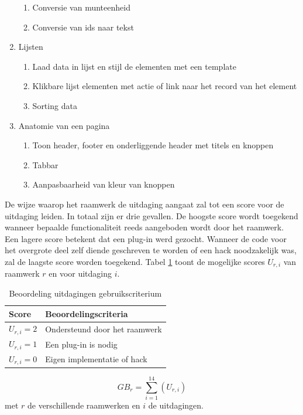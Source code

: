 \begin{enumerate}[label*=U \arabic*.]
\begin{enumerate}[label*=\arabic*]
\item Conversie van munteenheid
\item Conversie van ids naar tekst	
\end{enumerate}
\item \label{challenge:lijsten}Lijsten
\begin{enumerate}[label*=\arabic*]
\item Laad data in lijst en stijl de elementen met een template
\item Klikbare lijst elementen met actie of link naar het record van het element
\item Sorting data
\end{enumerate}
\item \label{challenge:anatomie}Anatomie van een pagina
\begin{enumerate}[label*=\arabic*]
 \item Toon header,  footer en onderliggende header met titels en knoppen
 \item Tabbar
 \item Aanpasbaarheid van kleur van knoppen
 \end{enumerate}
\end{enumerate} 

De wijze waarop het raamwerk de uitdaging aangaat zal tot een score voor de uitdaging leiden.
In totaal zijn er drie gevallen.
De hoogste score wordt toegekend wanneer bepaalde functionaliteit reeds aangeboden wordt door het raamwerk. 
Een lagere score betekent dat een plug-in werd gezocht. 
Wanneer de code voor het overgrote deel zelf diende geschreven te worden of een hack noodzakelijk was, zal de laagste score worden toegekend.
Tabel \ref{tabel:scores-uitdagingen} toont de mogelijke scores $U_{r,i}$ van raamwerk $r$ en voor uitdaging $i$.
\begin{table}[h]	
  \centering
  \begin{tabular}{ll}
    \toprule
    \textbf{Score} & \textbf{Beoordelingscriteria}\\
    \midrule
    $U_{r,i} = 2$ & Ondersteund door het raamwerk\\
    $U_{r,i} = 1$ & Een plug-in is nodig\\
    $U_{r,i} = 0$ & Eigen implementatie of hack\\
    \bottomrule
  \end{tabular}
  \caption{Beoordeling uitdagingen gebruikscriterium}
  \label{tabel:scores-uitdagingen}
\end{table}
\begin{equation}
  GB_r = \sum_{i=1}^{14}{\left(U_{r,i}\right)}
  \label{eq:gebruik}
\end{equation}
met $r$ de verschillende raamwerken en $i$ de uitdagingen.
